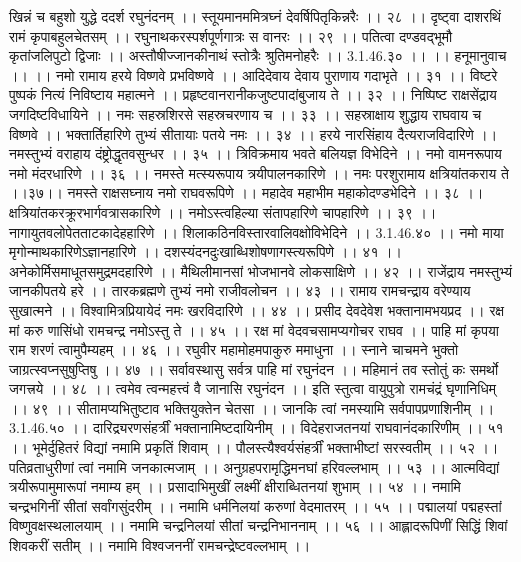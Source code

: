 खिन्नं च बहुशो युद्धे ददर्श रघुनंदनम् ।।
स्तूयमानममित्रघ्नं देवर्षिपितृकिन्नरैः ।। २८ ।।
दृष्ट्वा दाशरथिं रामं कृपाबहुलचेतसम् ।।
रघुनाथकरस्पर्शपूर्णगात्रः स वानरः ।। २९ ।।
पतित्वा दण्डवद्भूमौ कृतांजलिपुटो द्विजाः ।।
अस्तौषीज्जानकीनाथं स्तोत्रैः श्रुतिमनोहरैः ।। 3.1.46.३० ।।
।। हनूमानुवाच ।। ।।
नमो रामाय हरये विष्णवे प्रभविष्णवे ।।
आदिदेवाय देवाय पुराणाय गदाभृते ।। ३१ ।।
विष्टरे पुष्पकं नित्यं निविष्टाय महात्मने ।।
प्रहृष्टवानरानीकजुष्टपादांबुजाय ते ।। ३२ ।।
निष्पिष्ट राक्षसेंद्राय जगदिष्टविधायिने ।।
नमः सहस्रशिरसे सहस्रचरणाय च ।। ३३ ।।
सहस्राक्षाय शुद्धाय राघवाय च विष्णवे ।।
भक्तार्तिहारिणे तुभ्यं सीतायाः पतये नमः ।। ३४ ।।
हरये नारसिंहाय दैत्यराजविदारिणे ।।
नमस्तुभ्यं वराहाय दंष्ट्रोद्धृतवसुन्धर ।। ३५ ।।
त्रिविक्रमाय भवते बलियज्ञ विभेदिने ।।
नमो वामनरूपाय नमो मंदरधारिणे ।। ३६ ।।
नमस्ते मत्स्यरूपाय त्रयीपालनकारिणे ।।
नमः परशुरामाय क्षत्रियांतकराय ते ।।३७।।
नमस्ते राक्षसघ्नाय नमो राघवरूपिणे ।।
महादेव महाभीम महाकोदण्डभेदिने ।। ३८ ।।
क्षत्रियांतकरक्रूरभार्गवत्रासकारिणे ।।
नमोऽस्त्वहिल्या संतापहारिणे चापहारिणे ।। ३९ ।।
नागायुतवलोपेतताटकादेहहारिणे ।।
शिलाकठिनविस्तारवालिवक्षोविभेदिने ।। 3.1.46.४० ।।
नमो माया मृगोन्माथकारिणेऽज्ञानहारिणे ।।
दशस्यंदनदुःखाब्धिशोषणागस्त्यरूपिणे ।। ४१ ।।
अनेकोर्मिसमाधूतसमुद्रमदहारिणे ।।
मैथिलीमानसां भोजभानवे लोकसाक्षिणे ।। ४२ ।।
राजेंद्राय नमस्तुभ्यं जानकीपतये हरे ।।
तारकब्रह्मणे तुभ्यं नमो राजीवलोचन ।। ४३ ।।
रामाय रामचन्द्राय वरेण्याय सुखात्मने ।।
विश्वामित्रप्रियायेदं नमः खरविदारिणे ।। ४४ ।।
प्रसीद देवदेवेश भक्तानामभयप्रद ।।
रक्ष मां करु णासिंधो रामचन्द्र नमोऽस्तु ते ।। ४५ ।।
रक्ष मां वेदवचसामप्यगोचर राघव ।।
पाहि मां कृपया राम शरणं त्वामुपैम्यहम् ।। ४६ ।।
रघुवीर महामोहमपाकुरु ममाधुना ।।
स्नाने चाचमने भुक्तो जाग्रत्स्वप्नसुषुप्तिषु ।। ४७ ।।
सर्वावस्थासु सर्वत्र पाहि मां रघुनंदन ।।
महिमानं तव स्तोतुं कः समर्थो जगत्त्रये ।। ४८ ।।
त्वमेव त्वन्महत्त्वं वै जानासि रघुनंदन ।।
इति स्तुत्वा वायुपुत्रो रामचंद्रं घृणानिधिम् ।। ४९ ।।
सीतामप्यभितुष्टाव भक्तियुक्तेन चेतसा ।।
जानकि त्वां नमस्यामि सर्वपापप्रणाशिनीम् ।। 3.1.46.५० ।।
दारिद्र्यरणसंहर्त्रीं भक्तानामिष्टदायिनीम् ।।
विदेहराजतनयां राघवानंदकारिणीम् ।। ५१ ।।
भूमेर्दुहितरं विद्यां नमामि प्रकृतिं शिवाम् ।।
पौलस्त्यैश्वर्यसंहर्त्रीं भक्ताभीष्टां सरस्वतीम् ।। ५२ ।।
पतिव्रताधुरीणां त्वां नमामि जनकात्मजाम् ।।
अनुग्रहपरामृद्धिमनघां हरिवल्लभाम् ।। ५३ ।।
आत्मविद्यां त्रयीरूपामुमारूपां नमाम्य हम् ।।
प्रसादाभिमुखीं लक्ष्मीं क्षीराब्धितनयां शुभाम् ।। ५४ ।।
नमामि चन्द्रभगिनीं सीतां सर्वांगसुंदरीम् ।।
नमामि धर्मनिलयां करुणां वेदमातरम् ।। ५५ ।।
पद्मालयां पद्महस्तां विष्णुवक्षस्थलालयाम् ।।
नमामि चन्द्रनिलयां सीतां चन्द्रनिभाननाम् ।। ५६ ।।
आह्लादरूपिणीं सिद्धिं शिवां शिवकरीं सतीम् ।।
नमामि विश्वजननीं रामचन्द्रेष्टवल्लभाम् ।।
